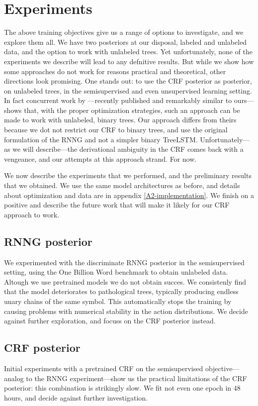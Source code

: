 \section{Experiments}
  The above training objectives give us a range of options to investigate, and we explore them all. We have two posteriors at our disposal, labeled and unlabeled data, and the option to work with unlabeled trees. Yet unfortunately, none of the experiments we describe will lead to any defnitive results. But while we show how some approaches do not work for reasons practical and theoretical, other directions look promising. One stands out: to use the CRF posterior as posterior, on unlabeled trees, in the semisupervised and even unsupervised learning setting. In fact concurrent work by \citet{kim2019unsupervised}---recently published and remarkably similar to ours---shows that, with the proper optimization strategies, such an approach can be made to work with unlabeled, binary trees. Our approach differs from theirs because we dot not restrict our CRF to binary trees, and use the original formulation of the RNNG and not a simpler binary TreeLSTM. Unfortunately---as we will describe---the derivational ambiguity in the CRF comes back with a vengeance, and our attempts at this approach strand. For now.

  We now describe the experiments that we performed, and the preliminary results that we obtained. We use the same model architectures as before, and details about optimization and data are in appendix \ref{A2-implementation}. We finish on a positive and describe the future work that will make it likely for our CRF approach to work.

  \subsection{RNNG posterior}
    We experimented with the discriminate RNNG posterior in the semisupervised setting, using the One Billion Word benchmark to obtain unlabeled data. Altough we use pretrained models we do not obtain succes. We consistenly find that the model deteriorates to pathological trees, typically producing endless unary chains of the same symbol. This automatically stops the training by causing problems with numerical stability in the action distributions. We decide against further exploration, and focuss on the CRF posterior instead.

  \subsection{CRF posterior}
    Initial experiments with a pretrained CRF on the semisupervised objective---analog to the RNNG experiment---show us the practical limitations of the CRF posterior: this combination is strikingly slow. We fit not even one epoch in 48 hours, and decide against further investigation.

